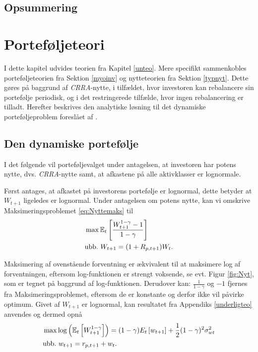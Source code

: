 \documentclass[
  a4paper,
  oneside]{memoir}
\begin{document}
\hypertarget{opsummering}{%
\section{Opsummering}\label{opsummering}}

\hypertarget{porteteori}{%
\chapter{Porteføljeteori}\label{porteteori}}

I dette kapitel udvides teorien fra Kapitel \ref{unteo}. Mere specifikt sammenkobles porteføljeteorien fra Sektion \ref{myoinv} og nytteteorien fra Sektion \ref{typnyt}. Dette gøres på baggrund af \emph{CRRA}-nytte, i tilfældet, hvor investoren kan rebalancere sin portefølje periodisk, og i det restringerede tilfælde, hvor ingen rebalancering er tilladt. Herefter beskrives den analytiske løsning til det dynamiske porteføljeproblem foreslået af \citep{JurVic2011}.

\hypertarget{crraportef}{%
\section{Den dynamiske portefølje}\label{crraportef}}

I det følgende vil porteføljevalget under antagelsen, at investoren har potens nytte, dvs. \emph{CRRA}-nytte samt, at afkastene på alle aktivklasser er lognormale.

Først antages, at afkastet på investorens portefølje er lognormal, dette betyder at \(W_{t+1}\) ligeledes er lognormal. Under antagelsen om potens nytte, kan vi omskrive Maksimeringsproblemet \eqref{eq:Nyttemaks} til
\begin{align}
&\max\mathbb{E}_t\left[\frac{W_{t+1}^{1-\gamma}-1}{1-\gamma}\right] \label{eq:CRRAmaks}\\
&\text{ubb.}\,\,W_{t+1}=(1+R_{p,t+1})W_t.\notag
\end{align}

Maksimering af ovenstående forventning er ækvivalent til at maksimere log af forventningen, eftersom log-funktionen er strengt voksende, se evt. Figur \ref{fig:Nyt}, som er tegnet på baggrund af log-funktionen. Derudover kan: \(\tfrac{1}{1-\gamma}\) og \(-1\) fjernes fra Maksimeringsproblemet, eftersom de er konstante og derfor ikke vil påvirke optimum. Givet af \(W_{t+1}\) er lognormal, kan resultatet fra Appendiks \ref{underligteo} anvendes og dermed opnå
\begin{align}
&\max \log\left(\mathbb{E}_t\left[W_{t+1}^{1-\gamma}\right]\right)=(1-\gamma){E}_t\left[w_{t+1}\right]+\frac{1}{2}(1-\gamma)^2\sigma_{wt}^2 \label{eq:CRRAmakslog}\\
&\text{ubb.}\,\,w_{t+1}=r_{p,t+1} + w_t.\notag
\end{align}
\end{document}

